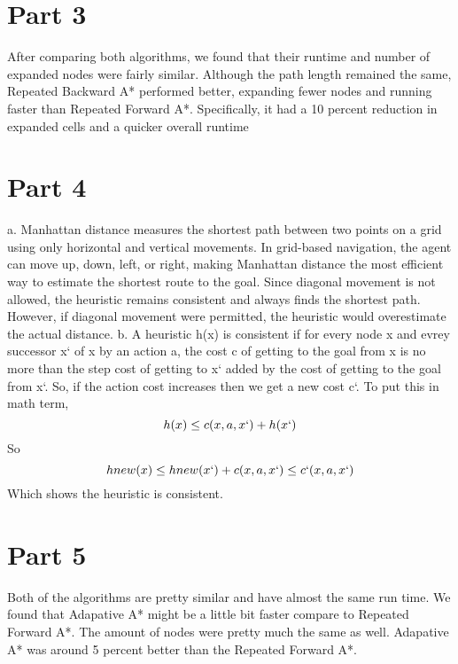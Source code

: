 \documentclass[12pt]{article}
\begin{document}
\section*{Part 3}
After comparing both algorithms, we found that their runtime and number of expanded nodes were fairly similar. Although the path length remained the same, Repeated Backward A* performed better, expanding fewer nodes and running faster than Repeated Forward A*. Specifically, it had a 10 percent reduction in expanded cells and a quicker overall runtime
\section*{Part 4}
a. Manhattan distance measures the shortest path between two points on a grid using only horizontal and vertical movements. In grid-based navigation, the agent can move up, down, left, or right, making Manhattan distance the most efficient way to estimate the shortest route to the goal. Since diagonal movement is not allowed, the heuristic remains consistent and always finds the shortest path. However, if diagonal movement were permitted, the heuristic would overestimate the actual distance.
\newline
\newline
b. A heuristic h(x) is consistent if for every node x and evrey successor x` of x by an action a, the cost c of getting to the goal from x is no more than the step cost of getting to x` added by the cost of getting to the goal from x`. So, if the action cost increases then we get a new cost c`. To put this in math term, \[ h(x) \leq c(x,a,x`) + h(x`)\] So \[hnew(x) \leq hnew(x`) + c(x,a,x`) \leq c`(x,a,x`)\] Which shows the heuristic is consistent. 

\section*{Part 5}
Both of the algorithms are pretty similar and have almost the same run time. We found that Adapative A* might be a little bit faster compare to Repeated Forward A*. The amount of nodes were pretty much the same as well. Adapative A* was around 5 percent better than the Repeated Forward A*.
\end{document}
